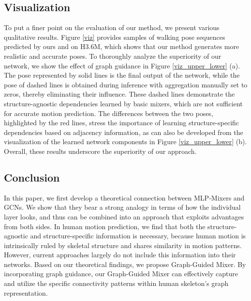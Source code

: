 \documentclass[10pt,twocolumn,letterpaper]{article}
\begin{document}
\subsection{Visualization}
To put a finer point on the evaluation of our method, we present various qualitative results.
Figure \ref{viz} provides samples of walking pose sequences predicted by ours and \cite{guo2023back} on H3.6M, which shows that our method generates more realistic and accurate poses.
To thoroughly analyze the superiority of our network, we show the effect of graph guidance in Figure \ref{viz_upper_lower} (a). The pose represented by solid lines is the final output of the network, while the pose of dashed lines is obtained during inference with aggregation manually set to zeros, thereby eliminating their influence.
These dashed lines demonstrate the structure-agnostic dependencies learned by basic mixers, which are not sufficient for accurate motion prediction. The differences between the two poses, highlighted by the red lines, stress the importance of learning structure-specific dependencies based on adjacency information, as can also be developed from the visualization of the learned network components in Figure \ref{viz_upper_lower} (b). Overall, these results underscore the superiority of our approach.




\subsection{Conclusion}
In this paper, we first develop a theoretical connection between MLP-Mixers and GCNs. We show that they bear a strong analogy in terms of how the individual layer looks, and thus can be combined into an approach that exploits advantages from both sides.
In human motion prediction, we find that both the structure-agnostic and structure-specific information is necessary, because human motion is intrinsically ruled by skeletal structure and shares similarity in motion patterns. However, current approaches largely do not include this information into their networks.
Based on our theoretical findings, we propose Graph-Guided Mixer. By incorporating graph guidance, our Graph-Guided Mixer can effectively capture and utilize the specific connectivity patterns within human skeleton’s graph representation.

\normalem
{\small


}
\end{document}
